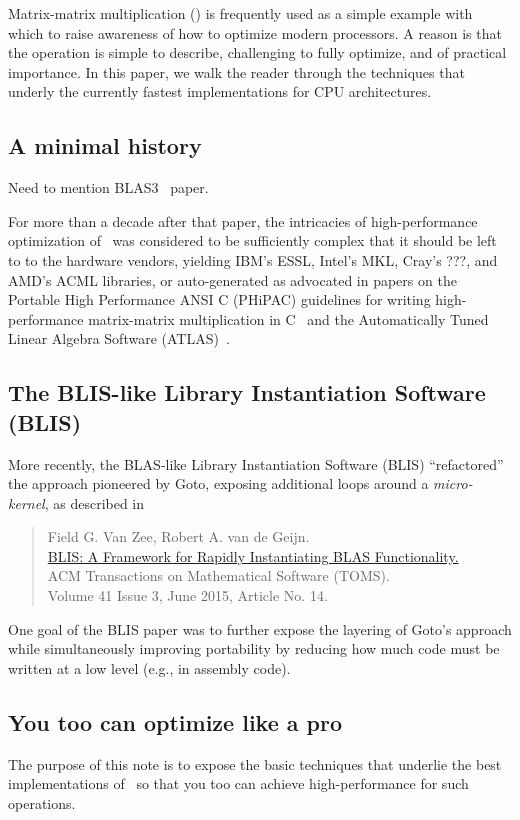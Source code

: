 Matrix-matrix multiplication (\Gemm) is frequently used as a simple example with which to raise awareness of how to optimize modern processors.  A reason is that the operation is simple to describe, challenging to fully optimize, and of practical importance.  In this paper, we walk the reader through the techniques that underly the currently fastest implementations for CPU architectures.

\subsection{A minimal history}

Need to mention BLAS3~\cite{BLAS3} paper.


For more than a decade after that paper, the intricacies of 
high-performance optimization of \Gemm\ was considered to be 
sufficiently complex that it should be left to to the hardware vendors, yielding IBM's ESSL, Intel's MKL, Cray's ???, and AMD's ACML libraries, or auto-generated as advocated in papers on 
the Portable High Performance ANSI C (PHiPAC) guidelines for writing high-performance matrix-matrix multiplication in C~\cite{} and the Automatically Tuned Linear Algebra Software (ATLAS)~\cite{}.



\subsection{The BLIS-like Library Instantiation Software (BLIS)}

More recently, the BLAS-like Library Instantiation Software (BLIS) ``refactored'' the approach pioneered by Goto, exposing additional loops around a {\em micro-kernel}, as described in
\begin{quote}
	Field G. Van Zee, Robert A. van de Geijn. \\
	\href{http://dl.acm.org/citation.cfm?id=2786970.2764454&coll=DL&dl=GUIDE&CFID=702354034&CFTOKEN=48470379}{%
		BLIS: A Framework for Rapidly Instantiating BLAS Functionality.} \\
	ACM Transactions on Mathematical Software (TOMS).\\
	Volume 41 Issue 3, June 2015,
	Article No. 14.
\end{quote}
One goal of the BLIS paper was to further expose the layering of Goto's approach while simultaneously improving portability by reducing how much code must be written at a low level (e.g., in assembly code).

\subsection{You too can optimize like a pro}

The purpose of this note is to expose the basic techniques that 
underlie the best implementations of \Gemm\ so that you too can achieve high-performance for such operations.

